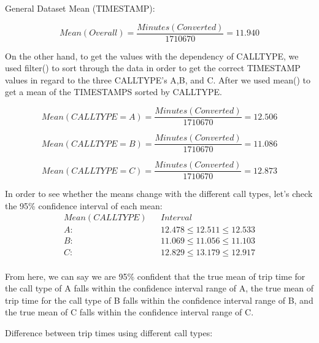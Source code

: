 \documentclass[11pt]{article}
\begin{document}
\par
General Dataset Mean (TIMESTAMP):

\begin{equation}
Mean (Overall) = \frac{Minutes (Converted)}{1710670} = 11.940
\end{equation}

\par
On the other hand, to get the values with the dependency of CALLTYPE, we used filter() to sort through the data in order to get the correct TIMESTAMP values in regard to the three CALLTYPE’s A,B, and C. After we used mean() to get a mean of the TIMESTAMPS sorted by CALLTYPE. 

\begin{equation}
Mean (CALLTYPE = A) = \frac{Minutes (Converted)}{1710670} = 12.506
\end{equation}

\begin{equation}
Mean (CALLTYPE = B) = \frac{Minutes (Converted)}{1710670} = 11.086
\end{equation}

\begin{equation}
Mean (CALLTYPE = C) = \frac{Minutes (Converted)}{1710670} = 12.873
\end{equation}

\par
In order to see whether the means change with the different call types, let's check the 95\% confidence interval of each mean:
\begin{equation*}
	\begin{aligned}
		Mean (CALL TYPE) &&Interval\\
A:  && 12.478 \le 12.511 \le 12.533\\
B: && 11.069 \le 11.056 \le 11.103\\
C:  && 12.829 \le 13.179 \le 12.917\\
	\end{aligned}
\end{equation*}
\par
From here, we can say we are 95\% confident that the true mean of trip time for the call type of A falls within the confidence interval range of A, the true mean of trip time for the call type of B falls within the confidence interval range of B, and the true mean of C falls within the confidence interval range of C.

\par
Difference between trip times using different call types:
\end{document}
